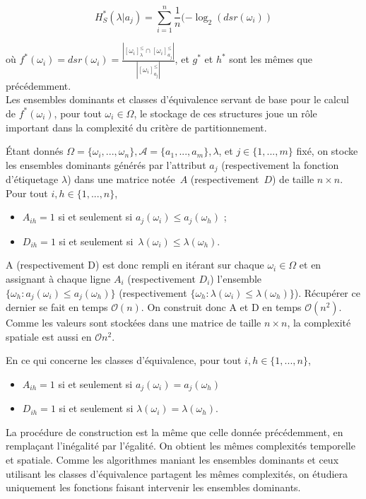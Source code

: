 \documentclass[a4paper]{article}
\begin{document}
$$ H^*_S(\lambda | a_j) = \sum_{i=1}^{n} \frac{1}{n} (-\log_{2} (dsr(\omega_i))$$

où $f^*(\omega_i) = dsr(\omega_i) = \frac{|[\omega_i]^{\leq}_{\lambda} \cap
[\omega_i]^{\leq}_{a_j}|}{|[\omega_i]^{\leq}_{a_j}|}$, et $g^*$ et $h^*$ sont
les mêmes que précédemment. \\

Les ensembles dominants et classes d'équivalence servant de base pour le calcul
de $f^*(\omega_i)$, pour tout $\omega_i \in \Omega$, le stockage de ces
structures joue un rôle important dans la complexité du critère de
partitionnement.

Étant donnés $\Omega = \{\omega_i, ... , \omega_n\}, \mathcal{A} = \{a_1, ...,
a_m\}, \lambda$, et $j \in \{1, ..., m\}$ fixé, on stocke les ensembles
dominants générés par l'attribut $a_j$ (respectivement la fonction d'étiquetage $\lambda$) dans une matrice notée~$A$ (respectivement~$D$) de taille $n \times n$. Pour tout $i,
h \in \{1,...,n\}$,
\begin{itemize} 
    \item $A_{ih} = 1$ si et seulement si $a_j(\omega_i) \leq
a_j(\omega_h)$ ;
    \item $D_{ih}= 1$ si et seulement si~$\lambda(\omega_i) \leq \lambda(\omega_h)$.
\end{itemize}
A (respectivement D) est donc rempli en itérant sur chaque $\omega_i \in \Omega$
et en assignant à chaque ligne $A_i$ (respectivement $D_i$) l'ensemble
$\{\omega_h : a_j(\omega_i) \leq a_j(\omega_h)\}$ (respectivement $\{\omega_h :
\lambda(\omega_i) \leq \lambda(\omega_h)\}$). Récupérer ce dernier se fait en
temps $\mathcal{O}(n)$. On construit donc A et D en temps $\mathcal{O}(n^2)$.
Comme les valeurs sont stockées dans une matrice de taille $n \times n$, la
complexité spatiale est aussi en $\mathcal{O}{n^2}$.

En ce qui concerne les classes d'équivalence, pour tout $i, h \in \{1,...,n\}$,
\begin{itemize}
    \item $A_{ih} = 1$ si et seulement si $a_j(\omega_i) = a_j(\omega_h)$
    \item $D_{ih} = 1$ si et seulement si $\lambda(\omega_i) = \lambda(\omega_h)$. 
\end{itemize}
La procédure de construction est la même que celle donnée
précédemment, en remplaçant l'inégalité par l'égalité. On obtient les mêmes
complexités temporelle et spatiale. Comme les algorithmes maniant les ensembles
dominants et ceux utilisant les classes d'équivalence partagent les mêmes
complexités, on étudiera uniquement les fonctions faisant intervenir les
ensembles dominants. 
\end{document}
